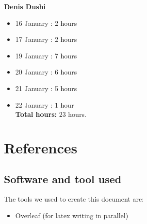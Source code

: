 \documentclass[a4paper]{article}
\begin{document}
\textbf{Denis Dushi}

\begin{itemize}
\item 16 January  :  2 hours
\item 17 January :  2 hours
\item 19 January :  7 hours
\item 20 January :  6 hours
\item 21 January :  5 hours
\item 22 January :  1 hour\\

\textbf{Total hours:} 23 hours.
\end{itemize}

\newpage
\section{References}
\subsection{Software and tool used}
The tools we used to create this document are:
\begin{itemize}
\item Overleaf (for latex writing in parallel)
\end{itemize}
\end{document}
